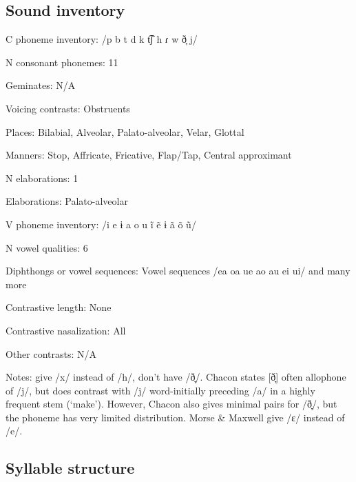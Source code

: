 {\subsection*{Sound inventory}
\begin{appendixdesc}

\item[C phoneme inventory:] /p b t d k t͡ʃ h ɾ w ð̞ j/

\item[N consonant phonemes:] 11

\item[Geminates:] N/A

\item[Voicing contrasts:] Obstruents

\item[Places:] Bilabial, Alveolar, Palato-alveolar, Velar, Glottal

\item[Manners:] Stop, Affricate, Fricative, Flap/Tap, Central approximant

\item[N elaborations:] 1

\item[Elaborations:] Palato-alveolar

\item[V phoneme inventory:] /i e ɨ a o u ĩ ẽ ɨ ã õ ũ/

\item[N vowel qualities:] 6

\item[Diphthongs or vowel sequences:] Vowel sequences /ea oa ue ao au ei ui/ and many more

\item[Contrastive length:] None

\item[Contrastive nasalization:] All

\item[Other contrasts:] N/A

\item[Notes:] \citet{MorseMaxwell1999} give /x/ instead of /h/, don’t have /ð̞/. Chacon states [ð̞] often allophone of /j/, but does contrast with /j/ word-initially preceding /a/ in a highly frequent stem (‘make’). However, Chacon also gives minimal pairs for /ð̞/, but the phoneme has very limited distribution. Morse \& Maxwell give /ɛ/ instead of /e/.
\end{appendixdesc}
\subsection*{Syllable structure}
\begin{appendixdesc}


\end{appendixdesc}}
